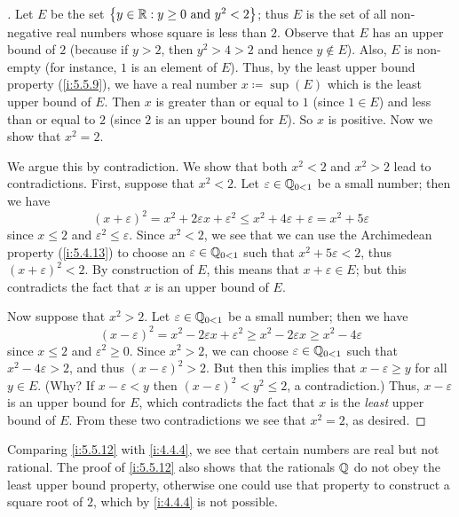 \begin{proof}[]
  Let \(E\) be the set \(\left\lbrace y \in \mathbb{R} : y \geq 0 \text{ and } y^2 < 2\right\rbrace\);
  thus \(E\) is the set of all non-negative real numbers whose square is less than \(2\).
  Observe that \(E\) has an upper bound of \(2\) (because if \(y > 2\), then \(y^2 > 4 > 2\) and hence \(y \notin E\)).
  Also, \(E\) is non-empty (for instance, \(1\) is an element of \(E\)).
  Thus, by the least upper bound property (\cref{i:5.5.9}), we have a real number \(x \coloneqq \sup(E)\) which is the least upper bound of \(E\).
  Then \(x\) is greater than or equal to \(1\) (since \(1 \in E\)) and less than or equal to \(2\)
  (since \(2\) is an upper bound for \(E\)).
  So \(x\) is positive.
  Now we show that \(x^2 = 2\).

  We argue this by contradiction.
  We show that both \(x^2 < 2\) and \(x^2 > 2\) lead to contradictions.
  First, suppose that \(x^2 < 2\).
  Let \(\varepsilon \in \mathbb{Q}_{0 < 1}\) be a small number;
  then we have
  \[
    (x + \varepsilon)^2 = x^2 + 2\varepsilon x + \varepsilon^2 \leq x^2 + 4\varepsilon + \varepsilon = x^2 + 5\varepsilon
  \]
  since \(x \leq 2\) and \(\varepsilon^2 \leq \varepsilon\).
  Since \(x^2 < 2\), we see that we can use the Archimedean property (\cref{i:5.4.13}) to choose an \(\varepsilon \in \mathbb{Q}_{0 < 1}\) such that \(x^2 + 5\varepsilon < 2\), thus \((x + \varepsilon)^2 < 2\).
  By construction of \(E\), this means that \(x + \varepsilon \in E\);
  but this contradicts the fact that \(x\) is an upper bound of \(E\).

  Now suppose that \(x^2 > 2\).
  Let \(\varepsilon \in \mathbb{Q}_{0 < 1}\) be a small number;
  then we have
  \[
    (x - \varepsilon)^2 = x^2 - 2\varepsilon x + \varepsilon^2 \geq x^2 - 2\varepsilon x \geq x^2 - 4\varepsilon
  \]
  since \(x \leq 2\) and \(\varepsilon^2 \geq 0\).
  Since \(x^2 > 2\), we can choose \(\varepsilon \in \mathbb{Q}_{0 < 1}\) such that \(x^2 - 4\varepsilon > 2\), and thus \((x - \varepsilon)^2 > 2\).
  But then this implies that \(x - \varepsilon \geq y\) for all \(y \in E\).
  (Why? If \(x - \varepsilon < y\) then \((x - \varepsilon)^2 < y^2 \leq 2\), a contradiction.)
  Thus, \(x - \varepsilon\) is an upper bound for \(E\), which contradicts the fact that \(x\) is the \emph{least} upper bound of \(E\).
  From these two contradictions we see that \(x^2 = 2\), as desired.
\end{proof}

\begin{rmk}\label{i:5.5.13}
  Comparing \cref{i:5.5.12} with \cref{i:4.4.4}, we see that certain numbers are real but not rational.
  The proof of \cref{i:5.5.12} also shows that the rationals \(\mathbb{Q}\) do not obey the least upper bound property, otherwise one could use that property to construct a square root of \(2\), which by \cref{i:4.4.4} is not possible.
\end{rmk}

